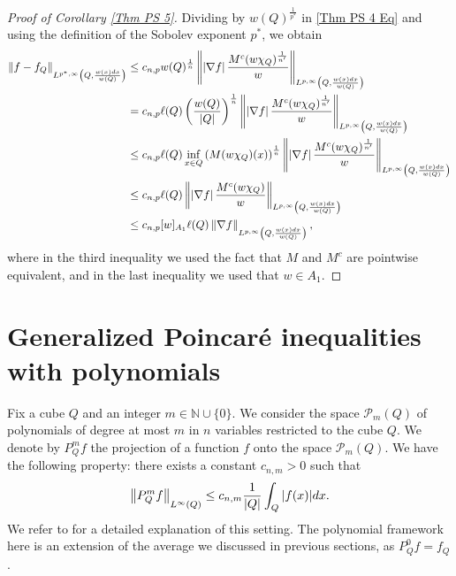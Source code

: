 \documentclass[reqno, 10pt, oneside]{amsart}
\numberwithin{equation}{section}
\newcommand{\strt}[1]{\rule{0pt}{#1}}
\numberwithin{theorem}{section}
\newcommand{\N}{{\mathbb N}}
\newcommand{\1}{{\rm 1\hspace*{-0.4ex}%
\rule{0.1ex}{1.52ex}\hspace*{0.2ex}}}
\begin{document}
\begin{proof}[Proof of Corollary \ref{Thm PS 5}]
Dividing by $w(Q)^\frac{1}{p^*}$ in \eqref{Thm PS 4 Eq} and using the definition of the Sobolev exponent $p^*$, we obtain
\begin{align*}
    \left\| f-f_Q\right\|_{\strt{2.3ex} L^{p^*,\infty}\left(Q,\frac{w(x)dx}{w(Q)}\right)}
    &\le c_{n,p} w(Q)^\frac{1}{n}\left\| \left| \nabla f \right| \frac{M^c(w\chi_Q)^\frac{1}{n'}}{w}\right\|_{\strt{2.3ex} L^{p,\infty}\left(Q,\frac{w(x)dx}{w(Q)}\right)} \\
    &= c_{n,p} \ell(Q)\left(\frac{w(Q)}{|Q|}\right)^\frac{1}{n}\left\| \left| \nabla f \right| \frac{M^c(w\chi_Q)^\frac{1}{n'}}{w}\right\|_{\strt{2.3ex} L^{p,\infty}\left(Q,\frac{w(x)dx}{w(Q)}\right)} \\
    &\le c_{n,p} \ell(Q)\inf_{x\in Q}\left(M(w\chi_Q)(x)\right)^\frac{1}{n}\left\| \left| \nabla f \right| \frac{M^c(w\chi_Q)^\frac{1}{n'}}{w}\right\|_{\strt{2.3ex} L^{p,\infty}\left(Q,\frac{w(x)dx}{w(Q)}\right)} \\
    &\le c_{n,p} \ell(Q)\left\| \left| \nabla f \right| \frac{M^c(w\chi_Q)}{w}\right\|_{\strt{2.3ex} L^{p,\infty}\left(Q,\frac{w(x)dx}{w(Q)}\right)} \\
    &\le c_{n,p} [w]_{A_1} \ell(Q)\left\| \nabla f \right\|_{\strt{2.3ex} L^{p,\infty}\left(Q,\frac{w(x)dx}{w(Q)}\right)},
\end{align*}
where in the third inequality we used the fact that $M$ and $M^c$ are pointwise equivalent, and in the last inequality we used that $w\in A_1$.
\end{proof}



    
\appendix
\section{Generalized Poincaré inequalities with polynomials}\label{S Polynomials}

Fix a cube $Q$ and an integer $m\in \N\cup \{0\}$. We consider the space $\mathcal{P}_m(Q)$ of polynomials of degree at most $m$ in $n$ variables restricted to the cube $Q$. We denote by $P_Q^m f$ the projection of a function $f$ onto the space $\mathcal{P}_m(Q)$.	We have the following property: there exists a constant $c_{n,m}>0$ such that 
	\begin{equation}\label{ProyPolinomio1}
		\left\| P_Q^m f \right\|_{\strt{2.3ex} L^\infty(Q)} \le c_{n,m} \frac{1}{|Q|} \int_Q |f(x)|  dx .
	\end{equation}
We refer to \cite[Section 8]{PR} for a detailed explanation of this setting. The polynomial framework here is an extension of the average we discussed in previous sections, as $P_Q^0 f = f_Q$.
\end{document}
